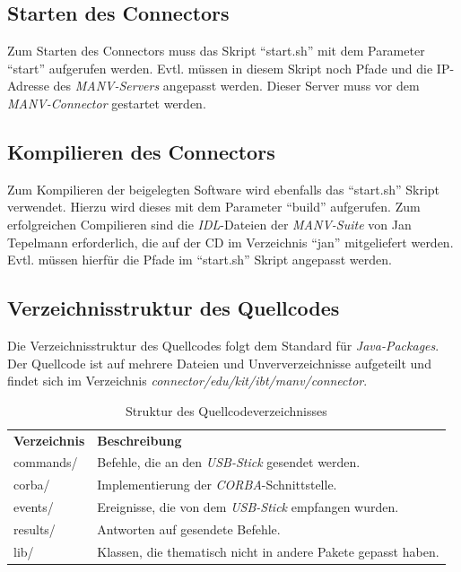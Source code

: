     \subsection{Starten des Connectors}

    Zum Starten des Connectors muss das Skript "`start.sh"' mit dem Parameter
    "`start"' aufgerufen werden. Evtl. müssen in diesem Skript noch Pfade
    und die IP-Adresse des \emph{MANV-Servers} angepasst werden. 
    Dieser Server muss vor dem \emph{MANV-Connector} gestartet werden.

    \subsection{Kompilieren des Connectors}

    Zum Kompilieren der beigelegten Software wird ebenfalls das "`start.sh"'
    Skript verwendet. Hierzu wird dieses mit dem Parameter "`build"' aufgerufen.
    Zum erfolgreichen Compilieren sind die \emph{IDL}-Dateien der \emph{MANV-Suite}
    von Jan Tepelmann erforderlich, die auf der CD im Verzeichnis "`jan"'
    mitgeliefert werden. Evtl. müssen hierfür die Pfade im "`start.sh"'
    Skript angepasst werden.

    \subsection{Verzeichnisstruktur des Quellcodes}

    Die Verzeichnisstruktur des Quellcodes folgt dem Standard für \emph{Java-Packages}.
    Der Quellcode ist auf mehrere Dateien und Unververzeichnisse aufgeteilt
    und findet sich im Verzeichnis \emph{connector/edu/kit/ibt/manv/connector}.
    
    \begin{table}
        \begin{tabular}{ll}
            \textbf{Verzeichnis} & \textbf{Beschreibung}\\

           commands/ & Befehle, die an den \emph{USB-Stick} gesendet werden.\\
           corba/    & Implementierung der \emph{CORBA}-Schnittstelle.\\
           events/   & Ereignisse, die von dem \emph{USB-Stick} empfangen wurden.\\
           results/  & Antworten auf gesendete Befehle.\\
           lib/      & Klassen, die thematisch nicht in andere Pakete gepasst haben.\\
        \end{tabular}
        \caption{Struktur des Quellcodeverzeichnisses}
    \end{table}

